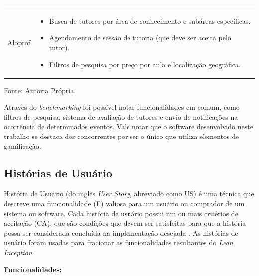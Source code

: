 \begin{table}[H]
\begin{tabularx}{\linewidth}{|l|X|}
\begin{itemize}[nosep, leftmargin=*, after=\vspace{\baselineskip}]
        \end{itemize}
        \\
        \hline
        Aloprof &
        \begin{itemize}[nosep, leftmargin=*, after=\vspace{\baselineskip}]
            \item Busca de tutores por área de conhecimento e subáreas específicas.
            \item Agendamento de sessão de tutoria (que deve ser aceita pelo tutor).
            \item Filtros de pesquisa por preço por aula e localização geográfica.
        \end{itemize}  
        \\
        \hline
    \end{tabularx}
    \vspace{0.1cm}
    
     Fonte: Autoria Própria.
\end{table}

Através do \textit{benchmarking} foi possível notar funcionalidades em comum, como filtros de pesquisa, sistema de avaliação de tutores e envio de notificações na ocorrência de determinados eventos. Vale notar que o software desenvolvido neste trabalho se destaca dos concorrentes por ser o único que utiliza elementos de gamificação.

 \subsection[Histórias de Usuário]{Histórias de Usuário}
\label{historias-usuario}

História de Usuário (do inglês \textit{User Story}, abreviado como US) é uma técnica que
descreve uma funcionalidade (F) valiosa para um usuário ou comprador de um sistema ou software. Cada história de usuário possui um ou mais critérios de aceitação (CA), que são condições que devem ser satisfeitas para que a história possa ser considerada concluída na implementação desejada \cite{cohn2004user}. As histórias de usuário foram usadas para fracionar as funcionalidades resultantes do \textit{Lean Inception}.

\textbf{Funcionalidades:}


